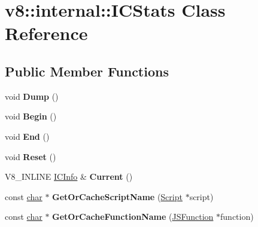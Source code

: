 \hypertarget{classv8_1_1internal_1_1ICStats}{}\section{v8\+:\+:internal\+:\+:I\+C\+Stats Class Reference}
\label{classv8_1_1internal_1_1ICStats}
\subsection*{Public Member Functions}
\begin{DoxyCompactItemize}
\item 
\mbox{\label{classv8_1_1internal_1_1ICStats_a590952674aff5e93e2d3da531b121d0e}} 
void {\bfseries Dump} ()
\item 
\mbox{\label{classv8_1_1internal_1_1ICStats_acea1d4f4edf616078ab4913179941f4c}} 
void {\bfseries Begin} ()
\item 
\mbox{\label{classv8_1_1internal_1_1ICStats_a2f34256af83f1acfa798a6fcae709a0f}} 
void {\bfseries End} ()
\item 
\mbox{\label{classv8_1_1internal_1_1ICStats_a67250f88d5af8afca938dc1d645498e6}} 
void {\bfseries Reset} ()
\item 
\mbox{\label{classv8_1_1internal_1_1ICStats_a63c148176181ac7a0d9d28073edc157a}} 
V8\+\_\+\+I\+N\+L\+I\+NE \mbox{\hyperlink{structv8_1_1internal_1_1ICInfo}{I\+C\+Info}} \& {\bfseries Current} ()
\item 
\mbox{\label{classv8_1_1internal_1_1ICStats_a326ff9aa4e47181f466d58ee327f9b87}} 
const \mbox{\hyperlink{classchar}{char}} $\ast$ {\bfseries Get\+Or\+Cache\+Script\+Name} (\mbox{\hyperlink{classv8_1_1internal_1_1Script}{Script}} $\ast$script)
\item 
\mbox{\label{classv8_1_1internal_1_1ICStats_afeecf23c3161391069a3d0cd0a285544}} 
const \mbox{\hyperlink{classchar}{char}} $\ast$ {\bfseries Get\+Or\+Cache\+Function\+Name} (\mbox{\hyperlink{classv8_1_1internal_1_1JSFunction}{J\+S\+Function}} $\ast$function)
\end{DoxyCompactItemize}
